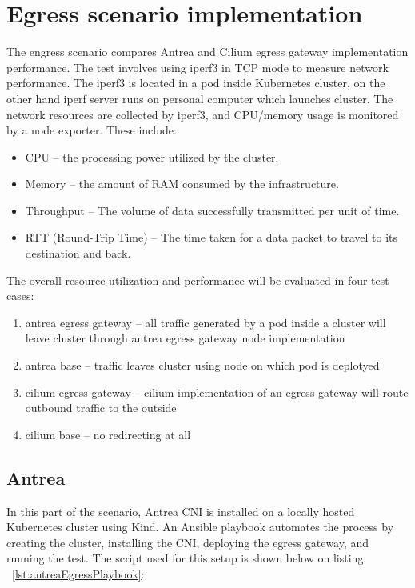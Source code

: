 

\section{Egress scenario implementation}
\label{sec:egressImpl}


The engress scenario compares Antrea and Cilium egress gateway implementation performance. The test involves using iperf3 in TCP mode to measure network performance. The iperf3 is located in a pod inside Kubernetes cluster, on the other hand iperf server runs on personal computer which launches cluster. The network resources are collected by iperf3, and CPU/memory usage is monitored by a node exporter. These include:
\begin{itemize}
  \item CPU -- the processing power utilized by the cluster.
  \item Memory -- the amount of RAM consumed by the infrastructure.
  \item Throughput -- The volume of data successfully transmitted per unit of time.
  \item RTT (Round-Trip Time) -- The time taken for a data packet to travel to its destination and back.
\end{itemize}

The overall resource utilization and performance will be evaluated in four test cases:

\begin{enumerate}
  \item antrea egress gateway -- all traffic generated by a pod inside a cluster will leave cluster through antrea egress gateway node implementation
  \item antrea base -- traffic leaves cluster using node on which pod is deplotyed
  \item cilium egress gateway -- cilium implementation of an egress gateway will route outbound traffic to the outside
  \item cilium base -- no redirecting at all
\end{enumerate}

\subsection{Antrea}
\label{sec:antreaEgress}

In this part of the scenario, Antrea CNI is installed on a locally hosted Kubernetes cluster using Kind. An Ansible playbook automates the process by creating the cluster, installing the CNI, deploying the egress gateway, and running the test. The script used for this setup is shown below on listing ~\ref{lst:antreaEgressPlaybook}:

